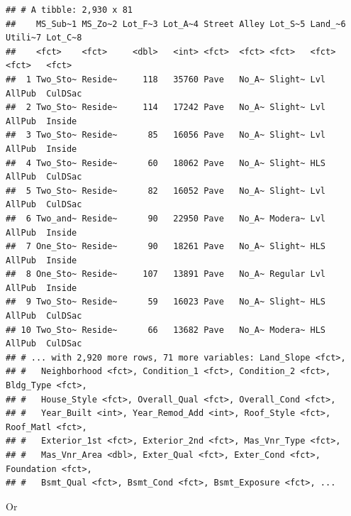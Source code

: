 \documentclass[
]{book}
\newenvironment{Shaded}{\begin{snugshade}}{\end{snugshade}}
\newcommand{\FunctionTok}[1]{\textcolor[rgb]{0.00,0.00,0.00}{#1}}
\newcommand{\NormalTok}[1]{#1}
\newcommand{\OtherTok}[1]{\textcolor[rgb]{0.56,0.35,0.01}{#1}}
\newcommand{\SpecialCharTok}[1]{\textcolor[rgb]{0.00,0.00,0.00}{#1}}
\begin{document}
\begin{verbatim}
## # A tibble: 2,930 x 81
##    MS_Sub~1 MS_Zo~2 Lot_F~3 Lot_A~4 Street Alley Lot_S~5 Land_~6 Utili~7 Lot_C~8
##    <fct>    <fct>     <dbl>   <int> <fct>  <fct> <fct>   <fct>   <fct>   <fct>  
##  1 Two_Sto~ Reside~     118   35760 Pave   No_A~ Slight~ Lvl     AllPub  CulDSac
##  2 Two_Sto~ Reside~     114   17242 Pave   No_A~ Slight~ Lvl     AllPub  Inside 
##  3 Two_Sto~ Reside~      85   16056 Pave   No_A~ Slight~ Lvl     AllPub  Inside 
##  4 Two_Sto~ Reside~      60   18062 Pave   No_A~ Slight~ HLS     AllPub  CulDSac
##  5 Two_Sto~ Reside~      82   16052 Pave   No_A~ Slight~ Lvl     AllPub  CulDSac
##  6 Two_and~ Reside~      90   22950 Pave   No_A~ Modera~ Lvl     AllPub  Inside 
##  7 One_Sto~ Reside~      90   18261 Pave   No_A~ Slight~ HLS     AllPub  Inside 
##  8 One_Sto~ Reside~     107   13891 Pave   No_A~ Regular Lvl     AllPub  Inside 
##  9 Two_Sto~ Reside~      59   16023 Pave   No_A~ Slight~ HLS     AllPub  CulDSac
## 10 Two_Sto~ Reside~      66   13682 Pave   No_A~ Modera~ HLS     AllPub  CulDSac
## # ... with 2,920 more rows, 71 more variables: Land_Slope <fct>,
## #   Neighborhood <fct>, Condition_1 <fct>, Condition_2 <fct>, Bldg_Type <fct>,
## #   House_Style <fct>, Overall_Qual <fct>, Overall_Cond <fct>,
## #   Year_Built <int>, Year_Remod_Add <int>, Roof_Style <fct>, Roof_Matl <fct>,
## #   Exterior_1st <fct>, Exterior_2nd <fct>, Mas_Vnr_Type <fct>,
## #   Mas_Vnr_Area <dbl>, Exter_Qual <fct>, Exter_Cond <fct>, Foundation <fct>,
## #   Bsmt_Qual <fct>, Bsmt_Cond <fct>, Bsmt_Exposure <fct>, ...
\end{verbatim}

Or

\begin{Shaded}
\end{Shaded}
\end{document}
